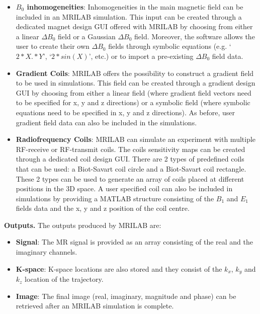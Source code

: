 \begin{itemize}
    \item \textbf{$B_0$ inhomogeneities}: Inhomogeneities in the main magnetic field can be included in an MRILAB simulation.
    This input can be created through a dedicated magnet design GUI offered with MRILAB by choosing from either a linear $\Delta B_0$ field or a Gaussian $\Delta B_0$ field.
    Moreover, the software allows the user to create their own $\Delta B_0$ fields through symbolic equations (e.g. `$2*X.*Y$', `$2*sin(X)$', etc.) or to import a pre-existing $\Delta B_0$ field data.
    
    \item \textbf{Gradient Coils}: MRILAB offers the possibility to construct a gradient field to be used in simulations.
    This field can be created through a gradient design GUI by choosing from either a linear field (where gradient field vectors need to be specified for x, y and z directions) or a symbolic field (where symbolic equations need to be specified in x, y and z directions).
    As before, user gradient field data can also be included in the simulations.
    
    \item \textbf{Radiofrequency Coils}: MRILAB can simulate an experiment with multiple RF-receive or RF-transmit coils.
    The coils sensitivity maps can be created through a dedicated coil design GUI.
    There are 2 types of predefined coils that can be used: a Biot-Savart coil circle and a Biot-Savart coil rectangle.
    These 2 types can be used to generate an array of coils placed at different positions in the 3D space.
    A user specified coil can also be included in simulations by providing a MATLAB structure consisting of the $B_1$ and $E_1$ fields data and the x, y and z position of the coil centre.
    
\end{itemize}

\hfill

\textbf{Outputs.} The outputs produced by MRILAB are:
\begin{itemize}
    
    \item \textbf{Signal}: The MR signal is provided as an array consisting of the real and the imaginary channels.
    
    \item \textbf{K-space}: K-space locations are also stored and they consist of the $k_x$, $k_y$ and $k_z$ location of the trajectory.
    
    \item \textbf{Image}: The final image (real, imaginary, magnitude and phase) can be retrieved after an MRILAB simulation is complete.
    
\end{itemize}

